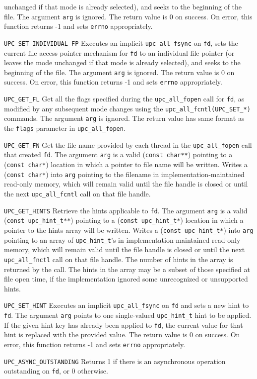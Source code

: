 \begin{description}
unchanged if that mode is already selected), and seeks 
to the beginning of the file.
The argument {\tt arg} is ignored.
The return value is 0 on success. On error, this function returns 
-1 and sets {\tt errno} appropriately.
\item{\tt UPC\_SET\_INDIVIDUAL\_FP} 
Executes an implicit {\tt upc\_all\_fsync} on {\tt fd}, sets the current 
file access pointer mechanism for {\tt fd} to an individual file pointer (or
leaves the mode unchanged if that mode is already selected), and seeks to the
beginning of the file.
The argument {\tt arg} is ignored.
The return value is 0 on success. On error, this function returns 
-1 and sets {\tt errno} appropriately.
\item{\tt UPC\_GET\_FL}
Get all the flags specified during the {\tt upc\_all\_fopen} call for {\tt fd},
as modified by any subsequent mode changes using the {\tt upc\_all\_fcntl(UPC\_SET\_*)} commands. 
The argument {\tt arg} is ignored.
The return value has same format as the {\tt flags} parameter in {\tt upc\_all\_fopen}.
\item{\tt UPC\_GET\_FN}
Get the file name provided by each thread in the {\tt upc\_all\_fopen} 
call that created {\tt fd}.
The argument {\tt arg} is a valid ({\tt const char**}) pointing to a ({\tt const char*}) location 
in which a pointer to file name will be written.
Writes a ({\tt const char*}) into {\tt *arg} pointing to the filename in implementation-maintained 
read-only memory, which will remain valid until the file handle 
is closed or until the next {\tt upc\_all\_fcntl} call on that file 
handle.
\item{\tt UPC\_GET\_HINTS}
Retrieve the hints applicable to {\tt fd}.
The argument {\tt arg} is a valid ({\tt const upc\_hint\_t**}) pointing to a ({\tt const upc\_hint\_t*}) 
location in which a pointer to the hints array will be written.
Writes a ({\tt const upc\_hint\_t*}) into {\tt *arg} pointing to an array of {\tt upc\_hint\_t}'s 
in implementation-maintained read-only memory, which will remain 
valid until the file handle is closed or until the next {\tt upc\_all\_fnctl} 
call on that file handle. The number of hints in the array is 
returned by the call.
The hints in the array may be a subset of those specified at 
file open time, if the implementation ignored some unrecognized 
or unsupported hints.
\item{\tt UPC\_SET\_HINT}
Executes an implicit {\tt upc\_all\_fsync} on {\tt fd} and sets a new 
hint to {\tt fd}.
The argument {\tt arg} points to one single-valued {\tt upc\_hint\_t} hint 
to be applied. If the given hint key has already been applied to {\tt fd}, 
the current value for that hint is replaced with the provided value.
The return value is 0 on success. On error, this function returns 
-1 and sets {\tt errno} appropriately.
\item
{}
{\tt UPC\_ASYNC\_OUTSTANDING} 
Returns 1 if there is an asynchronous operation outstanding 
on {\tt fd}, or 0 otherwise.
\end{description}

